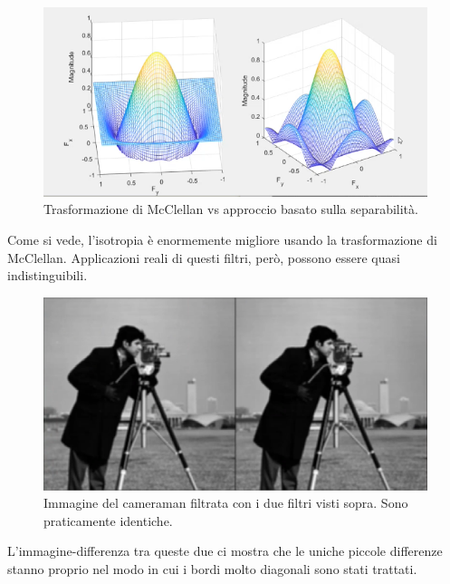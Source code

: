 \documentclass[a4paper,11pt]{article}
\begin{document}
\newpage
\renewcommand{\thefigure}{6.7}
\begin{figure}[!h]
  \centering
    \includegraphics[scale=0.6]{images/6/mcclellan_vs_sep_rect.png}
    \caption{Trasformazione di McClellan vs approccio basato sulla separabilità.}
\end{figure}

Come si vede, l'isotropia è enormemente migliore usando la trasformazione di McClellan. Applicazioni reali di questi filtri, però, possono essere quasi indistinguibili.

\renewcommand{\thefigure}{6.8}
\begin{figure}[!h]
  \centering
    \includegraphics[scale=0.45]{images/6/cameraman_mcclellan_vs_sep.png}
    \caption{Immagine del cameraman filtrata con i due filtri visti sopra. Sono praticamente identiche.}
\end{figure}

L'immagine-differenza tra queste due ci mostra che le uniche piccole differenze stanno proprio nel modo in cui i bordi molto diagonali sono stati trattati.
\end{document}
